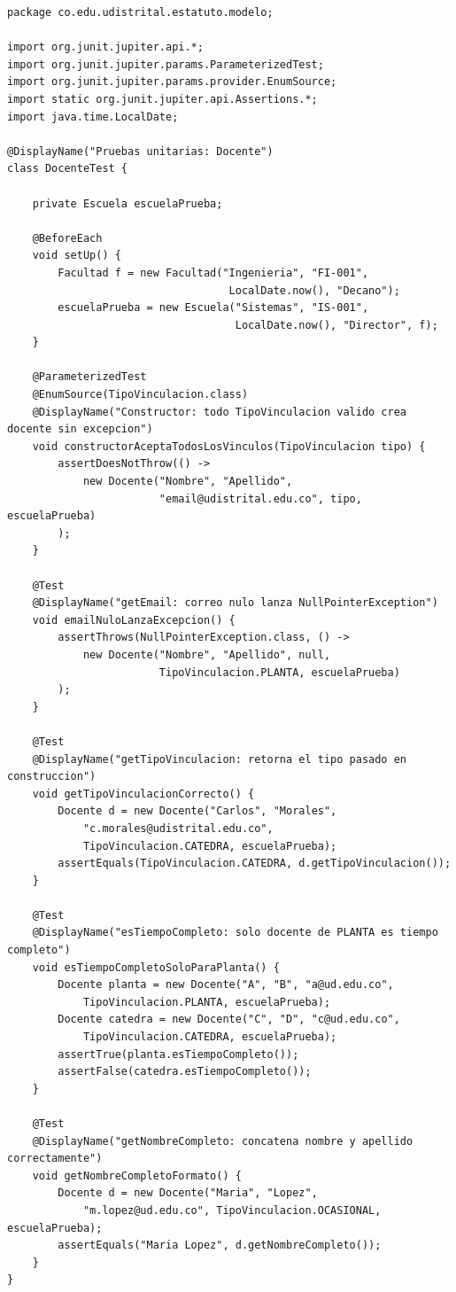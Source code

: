\begin{lstlisting}[style=javaStyle,
  caption={Clase de prueba \texttt{DocenteTest} con JUnit~5.},
  label={lst:junit-docente}]
package co.edu.udistrital.estatuto.modelo;

import org.junit.jupiter.api.*;
import org.junit.jupiter.params.ParameterizedTest;
import org.junit.jupiter.params.provider.EnumSource;
import static org.junit.jupiter.api.Assertions.*;
import java.time.LocalDate;

@DisplayName("Pruebas unitarias: Docente")
class DocenteTest {

    private Escuela escuelaPrueba;

    @BeforeEach
    void setUp() {
        Facultad f = new Facultad("Ingenieria", "FI-001",
                                   LocalDate.now(), "Decano");
        escuelaPrueba = new Escuela("Sistemas", "IS-001",
                                    LocalDate.now(), "Director", f);
    }

    @ParameterizedTest
    @EnumSource(TipoVinculacion.class)
    @DisplayName("Constructor: todo TipoVinculacion valido crea docente sin excepcion")
    void constructorAceptaTodosLosVinculos(TipoVinculacion tipo) {
        assertDoesNotThrow(() ->
            new Docente("Nombre", "Apellido",
                        "email@udistrital.edu.co", tipo, escuelaPrueba)
        );
    }

    @Test
    @DisplayName("getEmail: correo nulo lanza NullPointerException")
    void emailNuloLanzaExcepcion() {
        assertThrows(NullPointerException.class, () ->
            new Docente("Nombre", "Apellido", null,
                        TipoVinculacion.PLANTA, escuelaPrueba)
        );
    }

    @Test
    @DisplayName("getTipoVinculacion: retorna el tipo pasado en construccion")
    void getTipoVinculacionCorrecto() {
        Docente d = new Docente("Carlos", "Morales",
            "c.morales@udistrital.edu.co",
            TipoVinculacion.CATEDRA, escuelaPrueba);
        assertEquals(TipoVinculacion.CATEDRA, d.getTipoVinculacion());
    }

    @Test
    @DisplayName("esTiempoCompleto: solo docente de PLANTA es tiempo completo")
    void esTiempoCompletoSoloParaPlanta() {
        Docente planta = new Docente("A", "B", "a@ud.edu.co",
            TipoVinculacion.PLANTA, escuelaPrueba);
        Docente catedra = new Docente("C", "D", "c@ud.edu.co",
            TipoVinculacion.CATEDRA, escuelaPrueba);
        assertTrue(planta.esTiempoCompleto());
        assertFalse(catedra.esTiempoCompleto());
    }

    @Test
    @DisplayName("getNombreCompleto: concatena nombre y apellido correctamente")
    void getNombreCompletoFormato() {
        Docente d = new Docente("Maria", "Lopez",
            "m.lopez@ud.edu.co", TipoVinculacion.OCASIONAL, escuelaPrueba);
        assertEquals("Maria Lopez", d.getNombreCompleto());
    }
}
\end{lstlisting}

